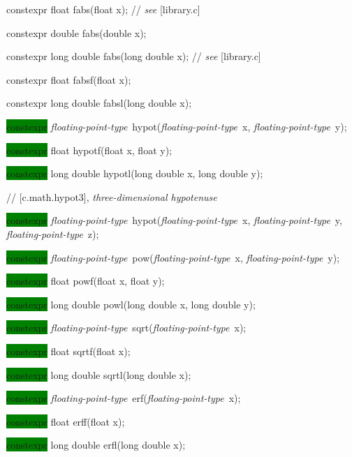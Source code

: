 \documentclass[prd,twocolumn,amsmath,amssymb,nofootinbib,eqsecnum]{revtex4-1}
\newcommand{\highlight}[1]{\colorbox{green}{\!\!\!\! #1}}
\newcommand{\oldhighlight}[1]{#1}
\newcommand{\stdcomment}[1]{{// {\it see} [#1]}}
\newcommand{\fptype}{{\it floating-point-type}}
\begin{document}
{%

\oldhighlight{constexpr} float fabs(float x); \stdcomment{library.c}

\oldhighlight{constexpr} double fabs(double x);

\oldhighlight{constexpr} long double fabs(long double x); \stdcomment{library.c}

\oldhighlight{constexpr} float fabsf(float x);

\oldhighlight{constexpr} long double fabsl(long double x);

\vspace{2ex}


\highlight{constexpr} \fptype\ hypot(\fptype\ x, \fptype\ y); 

\highlight{constexpr} float hypotf(float x, float y);

\highlight{constexpr} long double hypotl(long double x, long double y);

\vspace{2ex}

// [c.math.hypot3], {\it three-dimensional hypotenuse}


\highlight{constexpr} \fptype\ hypot(\fptype\ x, \fptype\ y, \fptype\ z);

\vspace{2ex}

\highlight{constexpr} \fptype\ pow(\fptype\ x, \fptype\ y); 

\highlight{constexpr} float powf(float x, float y);

\highlight{constexpr} long double powl(long double x, long double y);

\vspace{2ex}


\highlight{constexpr} \fptype\ sqrt(\fptype\ x);

\highlight{constexpr} float sqrtf(float x);

\highlight{constexpr} long double sqrtl(long double x);

\vspace{2ex}


\highlight{constexpr} \fptype\ erf(\fptype\ x);

\highlight{constexpr} float erff(float x);

\highlight{constexpr} long double erfl(long double x);

}
\end{document}
